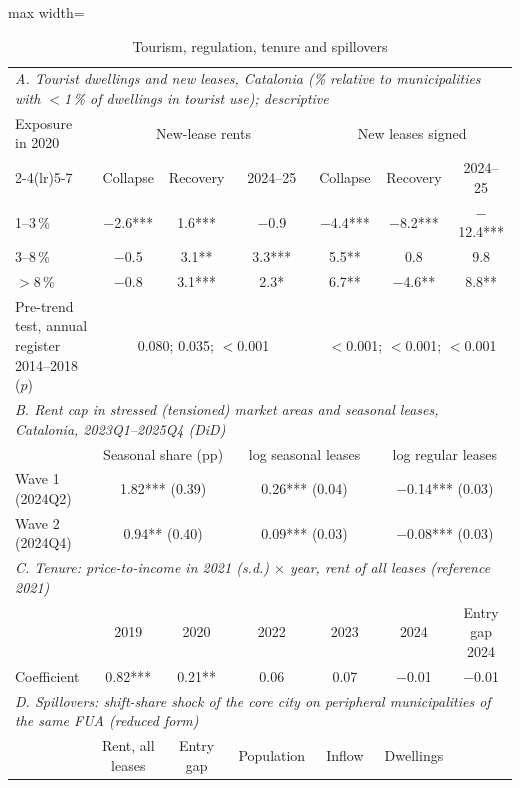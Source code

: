 \begin{table}[!htbp]\centering\small
\caption{Tourism, regulation, tenure and spillovers}\label{tab:channels}
\begin{adjustbox}{max width=\linewidth}\begin{tabular}{lcccccc}\toprule
\multicolumn{7}{l}{\textit{A. Tourist dwellings and new leases, Catalonia (\% relative to municipalities with $<$1\,\% of dwellings in tourist use); descriptive}}\\
Exposure in 2020 & \multicolumn{3}{c}{New-lease rents} & \multicolumn{3}{c}{New leases signed}\\\cmidrule(lr){2-4}\cmidrule(lr){5-7}
 & Collapse & Recovery & 2024--25 & Collapse & Recovery & 2024--25\\
1--3\,\% & $-$2.6*** & 1.6*** & $-$0.9 & $-$4.4*** & $-$8.2*** & $-$12.4***\\
3--8\,\% & $-$0.5 & 3.1** & 3.3*** & 5.5** & 0.8 & 9.8\\
$>$8\,\% & $-$0.8 & 3.1*** & 2.3* & 6.7** & $-$4.6** & 8.8**\\
Pre-trend test, annual register 2014--2018 ($p$) & \multicolumn{3}{c}{0.080; 0.035; $<$0.001} & \multicolumn{3}{c}{$<$0.001; $<$0.001; $<$0.001}\\
\midrule
\multicolumn{7}{l}{\textit{B. Rent cap in stressed (tensioned) market areas and seasonal leases, Catalonia, 2023Q1--2025Q4 (DiD)}}\\
 & \multicolumn{2}{c}{Seasonal share (pp)} & \multicolumn{2}{c}{log seasonal leases} & \multicolumn{2}{c}{log regular leases}\\
Wave 1 (2024Q2) & \multicolumn{2}{c}{1.82*** (0.39)} & \multicolumn{2}{c}{0.26*** (0.04)} & \multicolumn{2}{c}{$-$0.14*** (0.03)}\\
Wave 2 (2024Q4) & \multicolumn{2}{c}{0.94** (0.40)} & \multicolumn{2}{c}{0.09*** (0.03)} & \multicolumn{2}{c}{$-$0.08*** (0.03)}\\
\midrule
\multicolumn{7}{l}{\textit{C. Tenure: price-to-income in 2021 (s.d.) $\times$ year, rent of all leases (reference 2021)}}\\
 & 2019 & 2020 & 2022 & 2023 & 2024 & Entry gap 2024\\
Coefficient & 0.82*** & 0.21** & 0.06 & 0.07 & $-$0.01 & $-$0.01\\
\midrule
\multicolumn{7}{l}{\textit{D. Spillovers: shift-share shock of the core city on peripheral municipalities of the same FUA (reduced form)}}\\
 & Rent, all leases & Entry gap & Population & Inflow & Dwellings & \\

\end{tabular}
\end{adjustbox}
\end{table}
